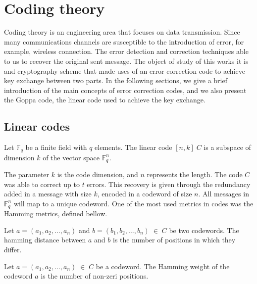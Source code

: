 \section{Coding theory}
Coding theory is an engineering area that focuses on data transmission. Since many communications channels are susceptible to the introduction of error, for example, wireless connection. The error detection and correction techniques able to us to recover the original sent message. The object of study of this works it is and cryptography scheme that made uses of an error correction code to achieve key exchange between two parts. In the following sections, we give a brief introduction of the main concepts of error correction codes, and we also present the Goppa code, the linear code used to achieve the key exchange.


\subsection{Linear codes}
\begin{definition}
Let $\mathbb{F}_{q}$ be a finite field with $q$ elements. The linear code $[n, k]\;C$ is a subspace of dimension $k$ of the vector space $\mathbb{F}_{q}^n$.
\end{definition}

The parameter $k$ is the code dimension, and $n$ represents the length. The code $C$ was able to correct up to $t$ errors. This recovery is given through the redundancy added in a message with size $k$, encoded in a codeword of size $n$. All messages in $\mathbb{F}_{q}^n$ will map to a unique codeword. One of the most used metrics in codes was the Hamming metrics, defined bellow.

\begin{definition}
Let $a = (a_1, a_2, \dots, a_n)$ and $b = (b_1, b_2, \dots, b_n) \; \in \; C$ be two codewords. The hamming distance between $a$ and $b$ is the number of positions in which they differ.
\end{definition}

\begin{definition}
Let $a = (a_1, a_2, \dots, a_n) \; \in \; C$ be a codeword. The Hamming weight of the codeword $a$ is the number of non-zeri positions.
\end{definition}


